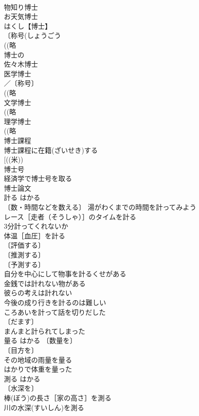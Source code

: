 \documentclass[8pt]{extreport}
\begin{document}
\begin{CJK}{UTF8}{min}
\\	物知り博士 
\\	お天気博士 
\\	はくし【博士】 
\\	〔称号(しょうごう　
\\	((略
\\	博士の 
\\	佐々木博士 
\\	医学博士 
\\	／〔称号〕
\\	((略
\\	文学博士 
\\	((略
\\	理学博士 
\\	((略
\\	博士課程 
\\	博士課程に在籍(ざいせき)する 
\\	[((米))
\\	博士号 
\\	経済学で博士号を取る 
\\	博士論文 
\\	計る	はかる	
\\	〔数・時間などを数える〕 湯がわくまでの時間を計ってみよう 
\\	レース［走者（そうしゃ）］のタイムを計る 
\\	3分計ってくれないか 
\\	体温［血圧］を計る 
\\	〔評価する〕
\\	〔推測する〕
\\	〔予測する〕
\\	自分を中心にして物事を計るくせがある 
\\	金銭では計れない物がある 
\\	彼らの考えは計れない 
\\	今後の成り行きを計るのは難しい 
\\	ころあいを計って話を切りだした 
\\	〔だます〕
\\	まんまと計られてしまった 
\\	量る	はかる	〔数量を〕
\\	〔目方を〕
\\	その地域の雨量を量る 
\\	はかりで体重を量った 
\\	測る	はかる	
\\	〔水深を〕
\\	棒(ぼう)の長さ［家の高さ］を測る 
\\	川の水深(すいしん)を測る 

\end{CJK}
\end{document}
